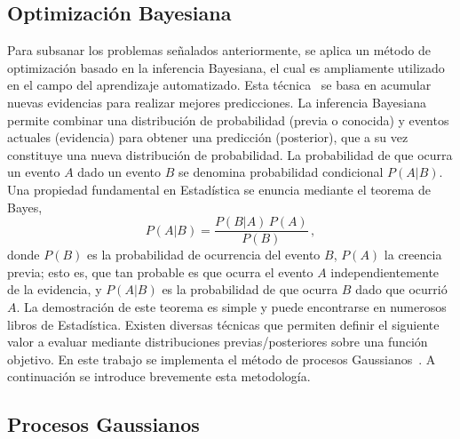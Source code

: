 \subsection{Optimización Bayesiana}
\label{sec:gaussianprocess}

Para subsanar los problemas señalados anteriormente, se aplica un método 
de optimización basado en la inferencia Bayesiana, el cual es 
ampliamente utilizado en el campo del aprendizaje automatizado. Esta 
técnica~\cite{Gelman:13,Barber:12} se basa en acumular nuevas evidencias 
para realizar mejores predicciones. La inferencia Bayesiana permite 
combinar una distribución de probabilidad (previa o conocida) y eventos 
actuales (evidencia) para obtener una predicción (posterior), que a su 
vez constituye una nueva distribución de probabilidad. La probabilidad 
de que ocurra un evento $A$ dado un evento $B$ se denomina probabilidad 
condicional $P(A|B)$. Una propiedad fundamental en Estadística se 
enuncia mediante el teorema de Bayes,
\begin{equation}
P(A|B)=\frac{P(B|A)\,P(A)}{P(B)}\,,
\end{equation}
donde $P(B)$ es la probabilidad de ocurrencia del evento $B$, $P(A)$ la
creencia previa; esto es, que tan probable es que ocurra el evento $A$
independientemente de la evidencia, y $P(A|B)$ es la probabilidad de que
ocurra $B$ dado que ocurrió $A$. La demostración de este teorema es 
simple y puede encontrarse en numerosos libros de Estadística. 
Existen diversas técnicas que permiten definir el siguiente valor a 
evaluar mediante distribuciones previas/posteriores sobre una función 
objetivo. En este trabajo se implementa el método de procesos 
Gaussianos~\cite{Bergstra:11}. A continuación se introduce brevemente
esta metodología.

\subsection{Procesos Gaussianos}

